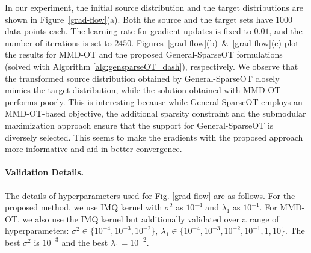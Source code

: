 In our experiment, the initial source distribution and the target distributions are shown in Figure~\ref{grad-flow}(a). Both the source and the target sets have $1000$ data points each. The learning rate for gradient updates is fixed to $0.01$, and the number of iterations is set to $2450$. 
Figures~\ref{grad-flow}(b)~\&~\ref{grad-flow}(c) plot the results for MMD-OT and the proposed General-SparseOT formulations (solved with Algorithm \ref{alg:gensparseOT_dash}), respectively. We observe that the transformed source distribution obtained by General-SparseOT closely mimics the target distribution, while the solution obtained with MMD-OT performs poorly. This is interesting because while General-SparseOT employs an MMD-OT-based objective, the additional sparsity constraint and the submodular maximization approach ensure that the support for General-SparseOT is diversely selected. This seems to make the gradients with the proposed approach more informative and aid in better convergence.
\paragraph{Validation Details.}
The details of hyperparameters used for Fig. \ref{grad-flow} are as follows. For the proposed method, we use IMQ kernel with $\sigma^2$ as $10^{-4}$ and $\lambda_1$ as $10^{-1}$. For MMD-OT, we also use the IMQ kernel but additionally validated over a range of hyperparameters: $\sigma^2\in\{10^{-4}, 10^{-3}, 10^{-2}\},~ \lambda_1\in \{10^{-4}, 10^{-3}, 10^{-2}, 10^{-1}, 1, 10\}$. The best $\sigma^2$ is $10^{-3}$ and the best $\lambda_1= 10^{-2}$.

